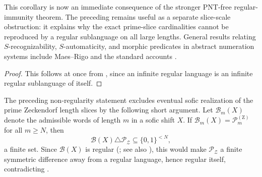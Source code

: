 This corollary is now an immediate consequence of the stronger
PNT-free regular-immunity theorem. The preceding
 remains useful as a
separate slice-scale obstruction: it explains why the exact
prime-slice cardinalities cannot be reproduced by a regular
sublanguage on all large lengths. General results relating
\(S\)-recognizability, \(S\)-automaticity, and morphic predicates in
abstract numeration systems include Maes--Rigo \cite{MaesRigo2002} and
the standard accounts \cite{AlloucheShallit2003,Rigo2014Vol1,Rigo2014Vol2}.

\begin{proof}
  This follows at once from
  , since an infinite
  regular language is an infinite regular sublanguage of itself.
\end{proof}

\begin{remark}
  \label{rem:zeckendorf-primes-not-sofic}
  The preceding non-regularity statement excludes eventual sofic
  realization of the prime Zeckendorf length slices by the following
  short argument.
  Let \(\mathcal B_m(X)\) denote the admissible words of length
  \(m\) in a sofic shift \(X\). If
  \(\mathcal B_m(X)=\mathcal P_m^{(\mathrm Z)}\) for all \(m\ge N\),
  then
  \[
    \mathcal B(X)\triangle\mathcal P_{\mathcal Z}\subseteq \{0,1\}^{<N},
  \]
  a finite set. Since \(\mathcal B(X)\) is regular
  (\cite[Theorem~3.2.1]{LindMarcus1995}; see also
  \cite[Chapter~4]{PerrinPin2004}), this would make
  \(\mathcal P_{\mathcal Z}\) a finite symmetric difference away from a
  regular language, hence regular itself, contradicting
  .
\end{remark}
